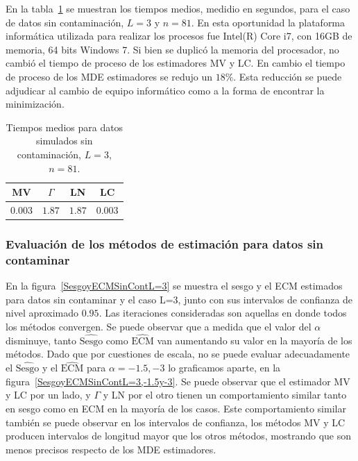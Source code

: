 En la tabla~\ref{tablaDeTiemposmediosMVyGAyLNyLC} se muestran los tiempos medios, medidio en segundos, para el caso de datos sin contaminación, $L=3$ y $n=81$. En esta oportunidad la plataforma informática utilizada para realizar los procesos fue Intel(R) Core i7, con 16GB de memoria, 64 bits Windows 7. Si bien se duplicó la memoria del procesador, no cambió el tiempo de proceso de los estimadores MV y LC. En cambio el tiempo de proceso de los MDE estimadores se redujo un $18\%$. Esta reducción se puede adjudicar al cambio de equipo informático como a la forma de encontrar la minimización.

\begin{table}[htb]
	\centering
	\begin{tabular}{cccc}
		\toprule
		MV& $\Gamma$ & LN & LC \\
		\midrule
		$0.003$& $1.87$ & $1.87$ &$0.003$ \\
		\bottomrule
	\end{tabular}
	\caption{\label{tablaDeTiemposmediosMVyGAyLNyLC}\small Tiempos medios para datos simulados sin contaminación, $L=3$, $n=81$. }
\end{table}

\subsubsection{Evaluación de los métodos de estimación para datos sin contaminar}

En la figura~\ref{SesgoyECMSinContL=3} se muestra el sesgo y el ECM estimados para datos sin contaminar y el caso L=3, junto con sus intervalos de confianza de nivel aproximado $0.95$. Las iteraciones consideradas son aquellas en donde todos los métodos convergen. Se puede observar que  a medida que el valor del $\alpha$ disminuye, tanto $\widehat{\text{Sesgo}}$ como $\widehat{\text{ECM}}$ van aumentando su valor en la mayoría de los métodos. Dado que por cuestiones de escala, no se puede evaluar adecuadamente el $\widehat{\text{Sesgo}}$ y el $\widehat{\text{ECM}}$ para $\alpha=-1.5, -3$ lo graficamos aparte, en la figura~\ref{SesgoyECMSinContL=3,-1.5y-3}. Se puede observar que el estimador MV y LC por un lado, y $\Gamma$ y LN por el otro tienen un comportamiento similar tanto en sesgo como en ECM en la mayoría de los casos. Este comportamiento similar también se puede observar en los intervalos de confianza, los métodos MV y LC producen intervalos de longitud mayor que los otros métodos, mostrando que son menos precisos respecto de los MDE estimadores.

